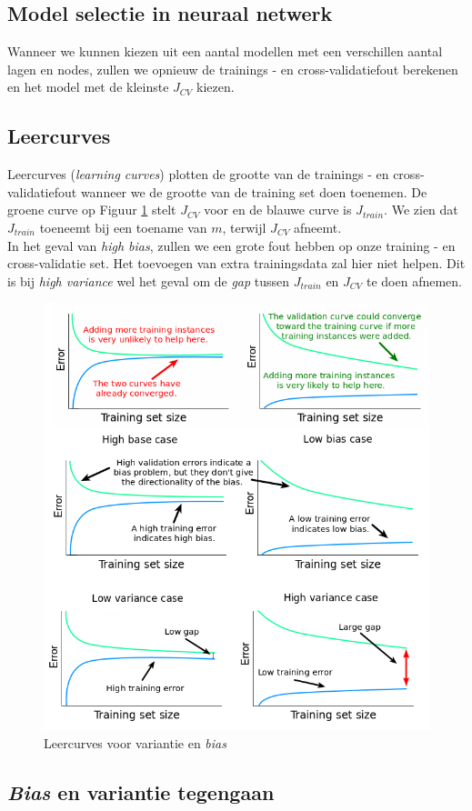 \subsection{Model selectie in neuraal netwerk}

Wanneer we kunnen kiezen uit een aantal  modellen met een verschillen aantal lagen en nodes, zullen we opnieuw de trainings - en cross-validatiefout berekenen en het model met de kleinste $J_{CV}$ kiezen. 

\subsection{Leercurves}

Leercurves (\textit{learning curves}) plotten de grootte van de trainings - en cross-validatiefout wanneer we de grootte van de training set doen toenemen. De groene curve op Figuur \ref{fig:learning-curves} stelt $J_{CV}$ voor en de blauwe curve is $J_{train}$. We zien dat $J_{train}$ toeneemt bij een toename van $m$, terwijl $J_{CV}$ afneemt. \\
\newline
In het geval van \textit{high bias}, zullen we een grote fout hebben op onze training - en cross-validatie set. Het toevoegen van extra trainingsdata zal hier niet helpen. Dit is bij \textit{high variance} wel het geval om de \textit{gap} tussen $J_{train}$ en $J_{CV}$ te doen afnemen.

\begin{figure}[h]
	\centering
	\includegraphics[width=0.5\linewidth]{images/20-learning-curves.png}
	\caption{Leercurves voor variantie en \textit{bias}}
	\label{fig:learning-curves}
\end{figure}
\newpage

\subsection{\textit{Bias} en variantie tegengaan}

